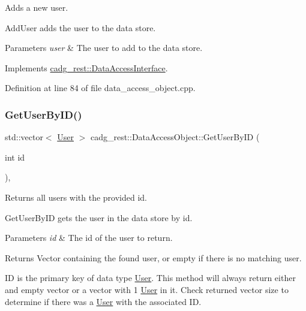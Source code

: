 Adds a new user. 

Add\+User adds the user to the data store.


\begin{DoxyParams}{Parameters}
{\em user} & The user to add to the data store. \\
\hline
\end{DoxyParams}


Implements \mbox{\hyperlink{classcadg__rest_1_1_data_access_interface_a625cb7ba6f4637e3157acda84f81eae9}{cadg\+\_\+rest\+::\+Data\+Access\+Interface}}.



Definition at line 84 of file data\+\_\+access\+\_\+object.\+cpp.

\mbox{\label{classcadg__rest_1_1_data_access_object_a54d23c50e3be7d80503f43e7ff82752e}} 
\subsubsection{\texorpdfstring{GetUserByID()}{GetUserByID()}}
{\footnotesize\ttfamily std\+::vector$<$ \mbox{\hyperlink{structcadg__rest_1_1_user}{User}} $>$ cadg\+\_\+rest\+::\+Data\+Access\+Object\+::\+Get\+User\+By\+ID (\begin{DoxyParamCaption}\item[{int}]{id }\end{DoxyParamCaption})\hspace{0.3cm}{\ttfamily [override]}, {\ttfamily [virtual]}}



Returns all users with the provided id. 

Get\+User\+By\+ID gets the user in the data store by id.


\begin{DoxyParams}{Parameters}
{\em id} & The id of the user to return. \\
\hline
\end{DoxyParams}
\begin{DoxyReturn}{Returns}
Vector containing the found user, or empty if there is no matching user.
\end{DoxyReturn}
ID is the primary key of data type \mbox{\hyperlink{structcadg__rest_1_1_user}{User}}. This method will always return either and empty vector or a vector with 1 \mbox{\hyperlink{structcadg__rest_1_1_user}{User}} in it. Check returned vector size to determine if there was a \mbox{\hyperlink{structcadg__rest_1_1_user}{User}} with the associated ID. 

